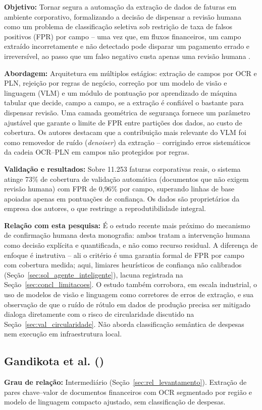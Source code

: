 \textbf{Objetivo:} Tornar segura a automação da extração de dados de faturas em ambiente corporativo, formalizando a decisão de dispensar a revisão humana como um problema de classificação seletiva sob restrição de taxa de falsos positivos (FPR) por campo -- uma vez que, em fluxos financeiros, um campo extraído incorretamente e não detectado pode disparar um pagamento errado e irreversível, ao passo que um falso negativo custa apenas uma revisão humana \cite{curcio2026safe}.

\textbf{Abordagem:} Arquitetura em múltiplos estágios: extração de campos por OCR e PLN, rejeição por regras de negócio, correção por um modelo de visão e linguagem (VLM) e um módulo de pontuação por aprendizado de máquina tabular que decide, campo a campo, se a extração é confiável o bastante para dispensar revisão. Uma camada geométrica de segurança fornece um parâmetro ajustável que garante o limite de FPR entre partições dos dados, ao custo de cobertura. Os autores destacam que a contribuição mais relevante do VLM foi como removedor de ruído (\textit{denoiser}) da extração -- corrigindo erros sistemáticos da cadeia OCR--PLN em campos não protegidos por regras.

\textbf{Validação e resultados:} Sobre 11.253 faturas corporativas reais, o sistema atinge 73\% de cobertura de validação automática (documentos que não exigem revisão humana) com FPR de 0,96\% por campo, superando linhas de base apoiadas apenas em pontuações de confiança. Os dados são proprietários da empresa dos autores, o que restringe a reprodutibilidade integral.

\textbf{Relação com esta pesquisa:} É o estudo recente mais próximo do mecanismo de confirmação humana desta monografia: ambos tratam a intervenção humana como decisão explícita e quantificada, e não como recurso residual. A diferença de enfoque é instrutiva -- ali o critério é uma garantia formal de FPR por campo com cobertura medida; aqui, limiares heurísticos de confiança não calibrados (Seção~\ref{sec:sol_agente_inteligente}), lacuna registrada na Seção~\ref{sec:concl_limitacoes}. O estudo também corrobora, em escala industrial, o uso de modelos de visão e linguagem como corretores de erros de extração, e sua observação de que o ruído de rótulo em dados de produção precisa ser mitigado dialoga diretamente com o risco de circularidade discutido na Seção~\ref{sec:val_circularidade}. Não aborda classificação semântica de despesas nem execução em infraestrutura local.

\subsection{Gandikota et al. (\citeyear{gandikota2026spatial})}
\textbf{Grau de relação:} Intermediário (Seção~\ref{sec:rel_levantamento}). Extração de pares chave--valor de documentos financeiros com OCR segmentado por região e modelo de linguagem compacto ajustado, sem classificação de despesas.

